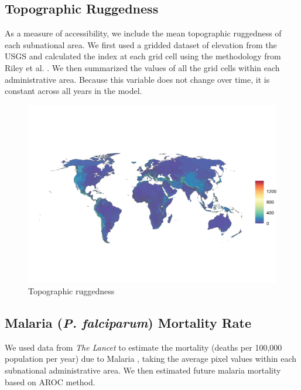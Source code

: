 \documentclass{article}
\begin{document}
\subsection{Topographic Ruggedness}
As a measure of accessibility, we include the mean topographic ruggedness of each subnational area.  We first used a gridded dataset of elevation from the USGS \cite{USGS1996} and calculated the index at each grid cell using the methodology from Riley et al. \citep{Riley1999}.  We then summarized the values of all the grid cells within each administrative area.  Because this variable does not change over time, it is constant across all years in the model.

\begin{figure}[H]
  \centering
  \includegraphics[width=\linewidth]{img/covars/ruggedness.png}
  \caption{Topographic ruggedness}
\end{figure}

\subsection{Malaria (\textit{P. falciparum}) Mortality Rate}
We used data from \textit{The Lancet} to estimate the mortality (deaths per 100,000 population per year) due to Malaria \citep{Weiss2019}, taking the average pixel values within each subnational administrative area.  We then estimated future malaria mortality based on AROC method.
\end{document}
